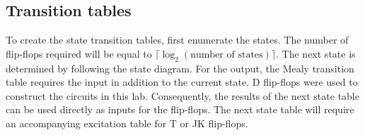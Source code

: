 \documentclass[11pt]{article}
\begin{document}
\pagebreak
\subsection{Transition tables}
To create the state transition tables, first enumerate the states. The number of flip-flops required will be equal to $\lceil \log_2 \left( \text{number of states} \right) \rceil$. The next state is determined by following the state diagram. For the output, the Mealy transition table requires the input in addition to the current state. D flip-flops were used to construct the circuits in this lab. Consequently, the results of the next state table can be used directly as inputs for the flip-flops. The next state table will require an accompanying excitation table for T or JK flip-flops.
\begin{figure}[htpb]
	\centering
\end{figure}
\end{document}
